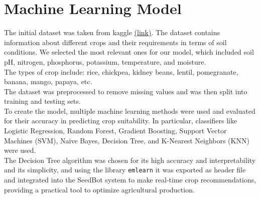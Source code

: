 \chapter{Machine Learning Model}

The initial dataset was taken from kaggle \href{https://www.kaggle.com/code/mdshariaremonshaikat/optimizing-agricultural-production-with-7-ml-model/input}{(link)}. The dataset contains information about different crops and their requirements in terms of soil conditions. We selected the most relevant ones for our model, which included soil pH, nitrogen, phosphorus, potassium, temperature, and moisture.\\
The types of crop include: rice, chickpea, kidney beans, lentil, pomegranate, banana, mango, papaya, etc.\\
The dataset was preprocessed to remove missing values and was then split into training and testing sets.\\
To create the model, multiple machine learning methods were used and evaluated for their accuracy in predicting crop suitability. In particular, classifiers like Logistic Regression, Random Forest, Gradient Boosting, Support Vector Machines (SVM), Naive Bayes, Decision Tree, and K-Nearest Neighbors (KNN) were used.\\
The Decision Tree algorithm was chosen for its high accuracy and interpretability and its simplicity, and using the library \texttt{emlearn} it was exported as header file and integrated into the SeedBot system to make real-time crop recommendations, providing a practical tool to optimize agricultural production.

